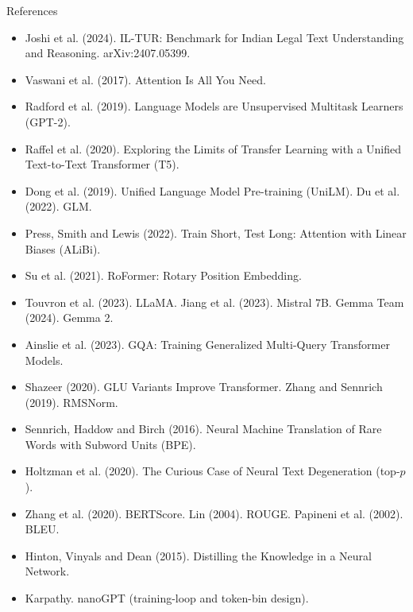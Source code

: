 \documentclass[aspectratio=169,11pt]{beamer}
\begin{document}
\begin{frame}{References}
  \scriptsize
  \begin{itemize}
    \item Joshi et al. (2024). IL-TUR: Benchmark for Indian Legal Text Understanding and Reasoning. arXiv:2407.05399.
    \item Vaswani et al. (2017). Attention Is All You Need.
    \item Radford et al. (2019). Language Models are Unsupervised Multitask Learners (GPT-2).
    \item Raffel et al. (2020). Exploring the Limits of Transfer Learning with a Unified Text-to-Text Transformer (T5).
    \item Dong et al. (2019). Unified Language Model Pre-training (UniLM). Du et al. (2022). GLM.
    \item Press, Smith and Lewis (2022). Train Short, Test Long: Attention with Linear Biases (ALiBi).
    \item Su et al. (2021). RoFormer: Rotary Position Embedding.
    \item Touvron et al. (2023). LLaMA. Jiang et al. (2023). Mistral 7B. Gemma Team (2024). Gemma 2.
    \item Ainslie et al. (2023). GQA: Training Generalized Multi-Query Transformer Models.
    \item Shazeer (2020). GLU Variants Improve Transformer. Zhang and Sennrich (2019). RMSNorm.
    \item Sennrich, Haddow and Birch (2016). Neural Machine Translation of Rare Words with Subword Units (BPE).
    \item Holtzman et al. (2020). The Curious Case of Neural Text Degeneration (top-$p$).
    \item Zhang et al. (2020). BERTScore. Lin (2004). ROUGE. Papineni et al. (2002). BLEU.
    \item Hinton, Vinyals and Dean (2015). Distilling the Knowledge in a Neural Network.
    \item Karpathy. nanoGPT (training-loop and token-bin design).
  \end{itemize}
\end{frame}
\end{document}

